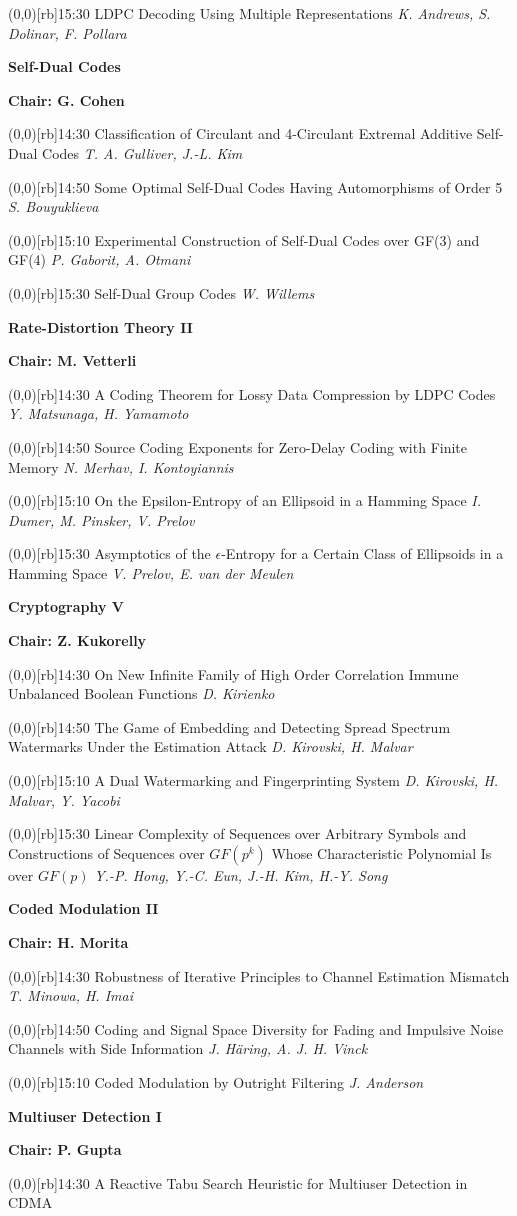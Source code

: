 \documentclass[a5paper,twoside]{article}
\def\sesstitle#1{\vspace{.45\bigskipamount}\par{\bfseries #1}\par}
\def\sesschair#1{{\bfseries Chair: #1}\par\vspace{.65\medskipamount}}
\def\papertime#1{\makebox(0,0)[rb]{{\scriptsize #1}\hspace{.5em}}}
\def\papertitle#1{#1\hfil\break}
\def\paperauthors#1{{\itshape #1}\par\filbreak\vspace{.65\medskipamount}}
\begin{document}
\papertime{15:30}%
\papertitle{LDPC Decoding Using Multiple Representations}
\paperauthors{K. Andrews, S. Dolinar, F. Pollara}
\sesstitle{Self-Dual Codes}
\sesschair{G. Cohen}
\papertime{14:30}%
\papertitle{Classification of Circulant and 4-Circulant Extremal Additive Self-Dual Codes}
\paperauthors{T. A. Gulliver, J.-L. Kim}
\papertime{14:50}%
\papertitle{Some Optimal Self-Dual Codes Having Automorphisms of Order 5}
\paperauthors{S. Bouyuklieva}
\papertime{15:10}%
\papertitle{Experimental Construction of Self-Dual Codes over GF(3) and GF(4)}
\paperauthors{P. Gaborit, A. Otmani}
\papertime{15:30}%
\papertitle{Self-Dual Group Codes}
\paperauthors{W. Willems}
\sesstitle{Rate-Distortion Theory II}
\sesschair{M. Vetterli}
\papertime{14:30}%
\papertitle{A Coding Theorem for Lossy Data Compression by LDPC Codes}
\paperauthors{Y. Matsunaga, H. Yamamoto}
\papertime{14:50}%
\papertitle{Source Coding Exponents for Zero-Delay Coding with Finite Memory}
\paperauthors{N. Merhav, I. Kontoyiannis}
\papertime{15:10}%
\papertitle{On the Epsilon-Entropy of an Ellipsoid in a Hamming Space}
\paperauthors{I. Dumer, M. Pinsker, V. Prelov}
\papertime{15:30}%
\papertitle{Asymptotics of the $\epsilon$-Entropy for a Certain Class of Ellipsoids in a Hamming Space}
\paperauthors{V. Prelov, E. van der Meulen}
\sesstitle{Cryptography V}
\sesschair{Z. Kukorelly}
\papertime{14:30}%
\papertitle{On New Infinite Family of High Order Correlation Immune Unbalanced Boolean Functions}
\paperauthors{D. Kirienko}
\papertime{14:50}%
\papertitle{The Game of Embedding and Detecting Spread Spectrum Watermarks Under the Estimation Attack}
\paperauthors{D. Kirovski, H. Malvar}
\papertime{15:10}%
\papertitle{A Dual Watermarking and Fingerprinting System}
\paperauthors{D. Kirovski, H. Malvar, Y. Yacobi}
\papertime{15:30}%
\papertitle{Linear Complexity of Sequences over Arbitrary Symbols and Constructions of Sequences over $GF(p^k)$ Whose Characteristic Polynomial Is over $GF(p)$}
\paperauthors{Y.-P. Hong, Y.-C. Eun, J.-H. Kim, H.-Y. Song}
\sesstitle{Coded Modulation II}
\sesschair{H. Morita}
\papertime{14:30}%
\papertitle{Robustness of Iterative Principles to Channel Estimation Mismatch}
\paperauthors{T. Minowa, H. Imai}
\papertime{14:50}%
\papertitle{Coding and Signal Space Diversity for Fading and Impulsive Noise Channels with Side Information}
\paperauthors{J. H\"aring, A. J. H. Vinck}
\papertime{15:10}%
\papertitle{Coded Modulation by Outright Filtering}
\paperauthors{J. Anderson}
\sesstitle{Multiuser Detection I}
\sesschair{P. Gupta}
\papertime{14:30}%
\papertitle{A Reactive Tabu Search Heuristic for Multiuser Detection in CDMA}
\end{document}
